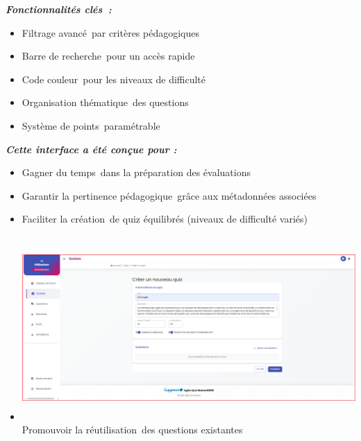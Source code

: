 \documentclass[12pt,a4paper,twoside]{report}
\begin{document}
\emph{\textbf{Fonctionnalités clés~:}}

\begin{itemize}
\item
  Filtrage avancé~par critères pédagogiques
\item
  Barre de recherche~pour un accès rapide
\item
  Code couleur~pour les niveaux de difficulté
\item
  Organisation thématique~des questions
\item
  Système de points~paramétrable
\end{itemize}

\emph{\textbf{Cette interface a été conçue pour :}}

\begin{itemize}
\item
  Gagner du temps~dans la préparation des évaluations
\item
  Garantir la pertinence pédagogique~grâce aux métadonnées associées
\item
  Faciliter la création~de quiz équilibrés (niveaux de difficulté
  variés)
\item
  \includegraphics[width=6.3in,height=2.76944in]{latex_media/media/image56.png}Promouvoir
  la réutilisation~des questions existantes
\end{itemize}
\end{document}
